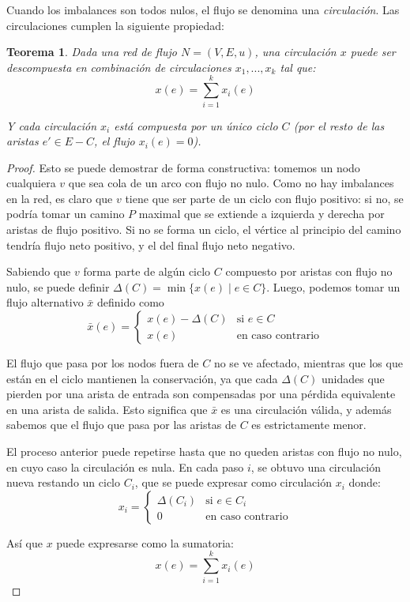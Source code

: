 \documentclass[a4paper]{report}
\newcommand{\si}{\text{si }}
\newcommand{\ecc}{\text{en caso contrario}}
\newtheorem*{theorem*}{Teorema}
\begin{document}
Cuando los imbalances son todos nulos, el flujo se denomina una \textit{circulación}. Las circulaciones cumplen la siguiente propiedad:

\begin{theorem*}
    Dada una red de flujo $N = (V, E, u)$, una circulación $x$ puede ser descompuesta en combinación de circulaciones $x_1, ..., x_k$ tal que:
    $$x(e) = \sum_{i = 1}^k x_i(e)$$

    Y cada circulación $x_i$ está compuesta por un único ciclo $C$ (por el resto de las aristas $e' \in E - C$, el flujo $x_i(e) = 0$).
\end{theorem*}
\begin{proof}
    Esto se puede demostrar de forma constructiva: tomemos un nodo cualquiera $v$ que sea cola de un arco con flujo no nulo. Como no hay imbalances en la red, es claro que $v$ tiene que ser parte de un ciclo con flujo positivo: si no, se podría tomar un camino $P$ maximal que se extiende a izquierda y derecha por aristas de flujo positivo. Si no se forma un ciclo, el vértice al principio del camino tendría flujo neto positivo, y el del final flujo neto negativo.

    Sabiendo que $v$ forma parte de algún ciclo $C$ compuesto por aristas con flujo no nulo, se puede definir $\Delta(C) = \min{\{x(e) \mid e \in C\}}$. Luego, podemos tomar un flujo alternativo $\bar{x}$ definido como
    $$
        \bar{x}(e) =
        \begin{cases}
            x(e) - \Delta(C) & \si e \in C \\
            x(e)             & \ecc
        \end{cases}
    $$

    El flujo que pasa por los nodos fuera de $C$ no se ve afectado, mientras que los que están en el ciclo mantienen la conservación, ya que cada $\Delta(C)$ unidades que pierden por una arista de entrada son compensadas por una pérdida equivalente en una arista de salida. Esto significa que $\bar{x}$ es una circulación válida, y además sabemos que el flujo que pasa por las aristas de $C$ es estrictamente menor.

    El proceso anterior puede repetirse hasta que no queden aristas con flujo no nulo, en cuyo caso la circulación es nula. En cada paso $i$, se obtuvo una circulación nueva restando un ciclo $C_i$, que se puede expresar como circulación $x_i$ donde:
    $$
        x_i =
        \begin{cases}
            \Delta(C_i) & \si e \in C_i \\
            0           & \ecc
        \end{cases}
    $$

    Así que $x$ puede expresarse como la sumatoria:
    $$x(e) = \sum_{i = 1}^k x_i(e)$$

\end{proof}
\end{document}
